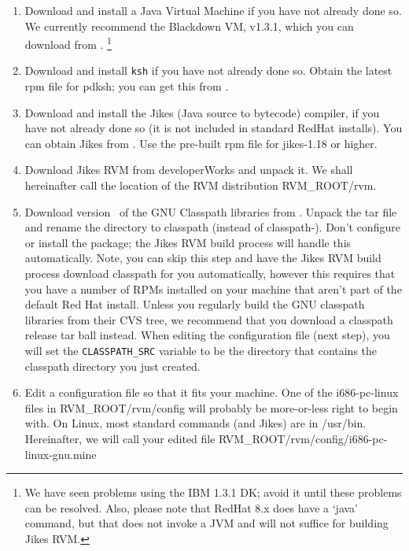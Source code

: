 \begin{enumerate}

\item Download and install a Java Virtual Machine if you have not
already done so.  We currently recommend the Blackdown VM, v1.3.1,
which you can download from \xlink{{\tt \BlackdownURL}}
{\BlackdownURL}. \footnote{We have seen problems using the IBM 1.3.1
DK; avoid it until these problems can be resolved. Also, please note
that RedHat 8.x does have a `java' command, but that does not invoke a
JVM and will not suffice for building Jikes RVM.}

\item Download and install {\tt ksh} if you have not already done so.
Obtain the latest rpm file for pdksh; you can get this from
. 

\item Download and install the Jikes (Java source to bytecode)
compiler, if you have not already 
done so (it is not included in standard RedHat installs).  You can
obtain Jikes from .
Use the pre-built rpm file for jikes-1.18 or higher.

\item Download Jikes RVM from developerWorks and unpack it.  We shall
hereinafter call the location of the RVM distribution RVM\_ROOT/rvm.

\item Download version \classpathversion\ of the GNU Classpath
libraries from \classpathftp. Unpack the tar file and rename the
directory to classpath (instead of classpath-\classpathversion). Don't
configure or install the package; the Jikes RVM build process will
handle this automatically.  Note, you can skip this step and have the
Jikes RVM build process download classpath for you automatically,
however this requires that you have a number of RPMs installed
on your machine that aren't part of the default Red Hat install.
Unless you regularly build the GNU classpath libraries from their CVS
tree, we recommend that you download a classpath release tar ball
instead. When editing the configuration file (next step), you will set
the {\tt CLASSPATH\_SRC} variable to be the directory that contains the
classpath directory you just created.  

\item Edit a configuration file so that it fits your machine.  One of
the i686-pc-linux files in RVM\_ROOT/rvm/config will probably be
more-or-less right to begin with.  On Linux, most standard commands
(and Jikes) are in /usr/bin.  Hereinafter, we will call your edited
file RVM\_ROOT/rvm/config/i686-pc-linux-gnu.mine


\end{enumerate}
